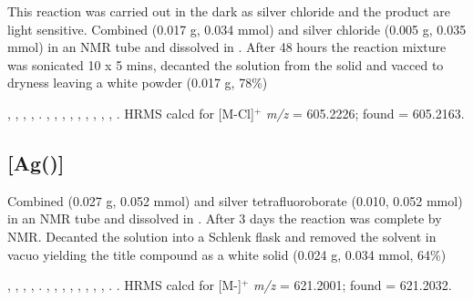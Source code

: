 
This reaction was carried out in the dark as silver chloride and the product are light sensitive.  Combined \tBuxantphos{} (0.017 g, 0.034 mmol) and silver chloride (0.005 g, 0.035 mmol) in an NMR tube and dissolved in .  After 48 hours the reaction mixture was sonicated 10 x 5 mins, decanted the solution from the solid and vacced to dryness leaving a white powder (0.017 g, 78\%)

,
,
,
,
.
,
,
,
,
,
,
,
,
,
.
HRMS calcd for  [M-Cl]$^+$ \emph{m/z} = 605.2226; found = 605.2163.


\subsection*{\texorpdfstring{[Ag(\tBusixantphos)]} A}


Combined \tBusixantphos{} (0.027 g, 0.052 mmol) and silver tetrafluoroborate (0.010, 0.052 mmol) in an NMR tube and dissolved in .  After 3 days the reaction was complete by NMR.  Decanted the solution into a Schlenk flask and removed the solvent in vacuo yielding the title compound as a white solid (0.024 g, 0.034 mmol, 64\%)

,
,
,
,
.
,
,
,
,
,
,
, %
,
.
.
HRMS calcd for  [M-]$^+$ \emph{m/z} = 621.2001; found = 621.2032.

